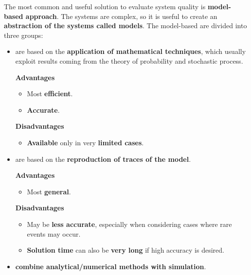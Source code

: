 \noindent
The most common and useful solution to evaluate system quality is \textbf{model-based approach}. The systems are complex, so it is useful to create an \textbf{abstraction of the systems called models}. The model-based are divided into three groups:
\begin{itemize}
	\item {} are based on the \textbf{application of mathematical techniques}, which usually exploit results coming from the theory of probability and stochastic process.
	\begin{flushleft}
		\textcolor{Green3}{ \textbf{Advantages}}
	\end{flushleft}
	\begin{itemize}
		\item Most \textbf{efficient}.
		\item \textbf{Accurate}.
	\end{itemize}
	\begin{flushleft}
		\textcolor{Red2}{ \textbf{Disadvantages}}
	\end{flushleft}
	\begin{itemize}
		\item \textbf{Available} only in very \textbf{limited cases}.
	\end{itemize}
	
	\item {} are based on the \textbf{reproduction of traces of the model}.
	\begin{flushleft}
		\textcolor{Green3}{ \textbf{Advantages}}
	\end{flushleft}
	\begin{itemize}
		\item Most \textbf{general}.
	\end{itemize}
	\begin{flushleft}
		\textcolor{Red2}{ \textbf{Disadvantages}}
	\end{flushleft}
	\begin{itemize}
		\item May be \textbf{less accurate}, especially when considering cases where rare events may occur.
		\item \textbf{Solution time} can also be \textbf{very long} if high accuracy is desired.
	\end{itemize}
	
	\item {} \textbf{combine analytical/numerical methods with simulation}.
\end{itemize}

